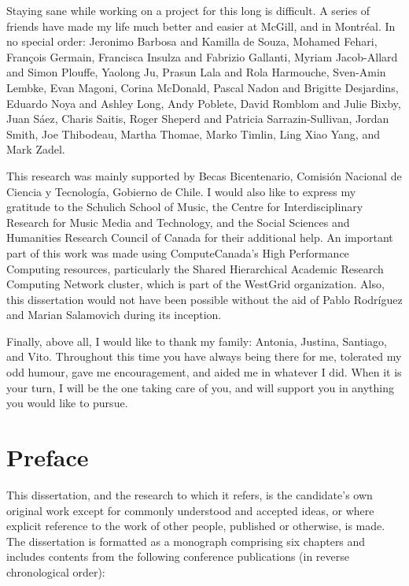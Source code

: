 \documentclass[12pt,letterpaper]{report}
\begin{document}
Staying sane while working on a project for this long is difficult. A series of friends have made my life much better and easier at McGill, and in Montr\'eal. In no special order: 
Jeronimo Barbosa and Kamilla de Souza, 
Mohamed Fehari,
Fran\c{c}ois Germain, 
Francisca Insulza and Fabrizio Gallanti,
Myriam Jacob-Allard and Simon Plouffe,
Yaolong Ju,  
Prasun Lala and Rola Harmouche, 
Sven-Amin Lembke, 
Evan Magoni, 
Corina McDonald, 
Pascal Nadon and Brigitte Desjardins,
Eduardo Noya and Ashley Long,
Andy Poblete,
David Romblom and Julie Bixby, 
Juan S\'aez, 
Charis Saitis, 
Roger Sheperd and Patricia Sarrazin-Sullivan, 
Jordan Smith,
Joe Thibodeau, 
Martha Thomae, 
Marko Timlin,
Ling Xiao Yang, and 
Mark Zadel.


This research was mainly supported by Becas Bicentenario, Comisi\'on Nacional de Ciencia y Tecnolog\'ia, Gobierno de Chile. I would also like to express my gratitude to the Schulich School of Music, the Centre for Interdisciplinary Research for Music Media and Technology, and the Social Sciences and Humanities Research Council of Canada for their additional help. An important part of this work was made using ComputeCanada's High Performance Computing resources, particularly the Shared Hierarchical Academic Research Computing Network cluster, which is part of the WestGrid organization. Also, this dissertation would not have been possible without the aid of Pablo Rodr\'iguez and Marian Salamovich during its inception. 


Finally, above all, I would like to thank my family: Antonia, Justina, Santiago, and Vito. Throughout this time you have always being there for me, tolerated my odd humour, gave me encouragement, and aided me in whatever I did. When it is your turn, I will be the one taking care of you, and will support you in anything you would like to pursue.


\newpage

\section*{\centering Preface}
This dissertation, and the research to which it refers, is the candidate’s own original work except for commonly understood and accepted ideas, or where explicit reference to the work of other people, published or otherwise, is made. The dissertation is formatted as a monograph comprising six chapters and includes contents from the following conference publications (in reverse chronological order):
\end{document}
